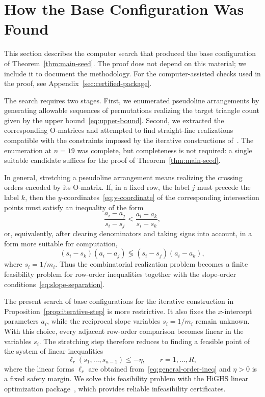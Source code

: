 \section{How the Base Configuration Was Found}\label{sec:search}

This section describes the computer search that produced the base
configuration of Theorem~\ref{thm:main-seed}. The proof does not depend on
this material; we include it to document the methodology.
For the computer-assisted checks used in the proof,
see Appendix~\ref{sec:certified-package}.

The search requires two stages.
First, we enumerated pseudoline arrangements by generating
allowable sequences of permutations realizing the target triangle count
given by the upper bound~\eqref{eq:upper-bound}.
Second, we extracted the corresponding $\mathrm{O}$-matrices and attempted to
find straight-line realizations compatible with the constraints imposed by the
iterative constructions of~\cite{forge1998,bartholdi2007}.
The enumeration at $n=19$ was complete, but completeness is not
required: a single suitable candidate suffices for the proof of
Theorem~\ref{thm:main-seed}.

In general, stretching a pseudoline arrangement means realizing the
crossing orders encoded by its $\mathrm{O}$-matrix. If, in a fixed row, the
label $j$ must precede the label $k$, then the $y$-coordinates~\eqref{eq:y-coordinate}
of the corresponding intersection points
must satisfy an inequality of the form
\begin{equation*}
\frac{a_i-a_j}{s_i-s_j} < \frac{a_i-a_k}{s_i-s_k},
\end{equation*}
or, equivalently, after clearing denominators and taking signs into account,
in a form more suitable for computation,
\begin{equation}
(s_i-s_k)(a_i-a_j) \lessgtr (s_i-s_j)(a_i-a_k),\label{eq:general-order-ineq}
\end{equation}
where $s_i=1/m_i$. Thus the combinatorial realization problem becomes a finite
feasibility problem for row-order inequalities together with the
slope-order conditions~\eqref{eq:slope-separation}.

The present search of base configurations for the iterative construction
in Proposition~\ref{prop:iterative-step} is more restrictive.
It also fixes the $x$-intercept parameters $a_i$, while the reciprocal slope variables
$s_i=1/m_i$ remain unknown. With this choice, every adjacent row-order
comparison becomes linear in the variables $s_i$. The stretching step therefore
reduces to finding a feasible point of the system of linear inequalities
\begin{equation}
\ell_r(s_1,\dots,s_{n-1})\le -\eta,\qquad r=1,\dots,R,\label{eq:linear-order-ineq}
\end{equation}
where the linear forms $\ell_r$ are obtained from~\eqref{eq:general-order-ineq} and
$\eta>0$ is a fixed safety margin. We solve this feasibility problem with the
HiGHS linear optimization package~\cite{huangfu2018dual}, which provides
reliable infeasibility certificates.


